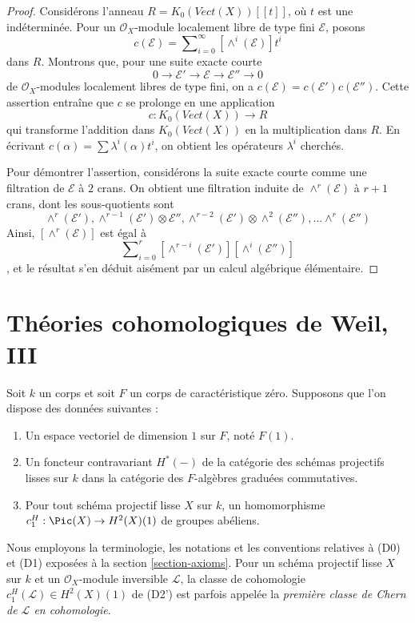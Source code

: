 \begin{proof}
Considérons l'anneau $R = K_0(\textit{Vect}(X))[[t]]$, où $t$ est une
indéterminée. Pour un $\mathcal{O}_X$-module localement libre de type fini
$\mathcal{E}$, posons
$$
c(\mathcal{E}) = \sum\nolimits_{i = 0}^\infty [\wedge^i(\mathcal{E})] t^i
$$
dans $R$. Montrons que, pour une suite exacte courte
$$
0 \to \mathcal{E}' \to \mathcal{E} \to \mathcal{E}'' \to 0
$$
de $\mathcal{O}_X$-modules localement libres de type fini,
on a $c(\mathcal{E}) = c(\mathcal{E}') c(\mathcal{E}'')$.
Cette assertion entraîne que $c$ se prolonge en une application
$$
c :  K_0(\textit{Vect}(X)) \longrightarrow R
$$
qui transforme l'addition dans $K_0(\textit{Vect}(X))$ en la multiplication dans $R$.
En écrivant $c(\alpha) = \sum \lambda^i(\alpha) t^i$, on obtient les opérateurs
$\lambda^i$ cherchés.

\medskip\noindent
Pour démontrer l'assertion, considérons la suite exacte courte comme une
filtration de $\mathcal{E}$ à $2$ crans. On obtient une filtration
induite de $\wedge^r(\mathcal{E})$ à $r + 1$ crans, dont les
sous-quotients sont
$$
\wedge^r(\mathcal{E}'),
\wedge^{r - 1}(\mathcal{E}') \otimes \mathcal{E}'',
\wedge^{r - 2}(\mathcal{E}') \otimes \wedge^2(\mathcal{E}''), \ldots
\wedge^r(\mathcal{E}'')
$$
Ainsi, $[\wedge^r(\mathcal{E})]$ est égal à
$$
\sum\nolimits_{i = 0}^r
[\wedge^{r - i}(\mathcal{E}')] [\wedge^i(\mathcal{E}'')]
$$,
et le résultat s'en déduit aisément par un calcul algébrique élémentaire.
\end{proof}










\section{Théories cohomologiques de Weil, III}
\label{section-c1}

\noindent
Soit $k$ un corps et soit $F$ un corps de caractéristique zéro.
Supposons que l'on dispose des données suivantes :
\begin{enumerate}
\item[(D0)] Un espace vectoriel de dimension $1$ sur $F$, noté $F(1)$.
\item[(D1)] Un foncteur contravariant $H^*(-)$ de la catégorie des schémas projectifs
lisses sur $k$ dans la catégorie des
$F$-algèbres graduées commutatives.
\item[(D2')] Pour tout schéma projectif lisse $X$ sur $k$, un homomorphisme
$c_1^H : \Pic(X) \to H^2(X)(1)$ de groupes abéliens.
\end{enumerate}
Nous employons la terminologie, les notations et les conventions relatives
à (D0) et (D1) exposées à la section \ref{section-axioms}.
Pour un schéma projectif lisse $X$ sur $k$ et un
$\mathcal{O}_X$-module inversible $\mathcal{L}$, la classe de cohomologie
$c_1^H(\mathcal{L}) \in H^2(X)(1)$ de (D2')
est parfois appelée la {\it première classe de Chern de $\mathcal{L}$
en cohomologie}.

